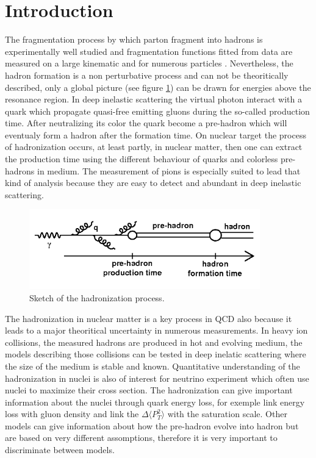 
\section{Introduction}
\label{physics}

The fragmentation process by which parton fragment into hadrons is 
experimentally well studied and fragmentation functions fitted from 
data are measured on a large kinematic and for numerous particles
\cite{AKK}.
Nevertheless, the hadron formation is a non perturbative process and can not 
be theoritically described, only a global picture 
(see figure \ref{fig:hadro}) can be drawn for
energies above the resonance region. In deep inelastic scattering the
virtual photon interact with a quark which propagate quasi-free emitting
gluons during the 
so-called production time. After neutralizing its color the quark become 
a pre-hadron which will eventualy form a hadron after the formation time.
On nuclear target the process of hadronization occurs, at least partly, in 
nuclear matter, then one can extract the production time using the different 
behaviour of quarks and colorless pre-hadrons in medium. The measurement of
pions is especially suited to lead that kind of analysis because they are easy
to detect and abundant in deep inelastic scattering.

\begin{figure}[htbp]
\centering
\includegraphics[width=10cm] {fig/hadro.png} 
\caption {Sketch of the hadronization process.}
\label{fig:hadro}
\end{figure}

The hadronization in nuclear matter is a key process in QCD also
because it leads to a major theoritical uncertainty in numerous measurements.
In heavy ion collisions, the measured hadrons are produced in hot and evolving 
medium, the models describing those collisions can be tested in deep inelatic scattering 
where the size of the medium is stable and known. Quantitative
understanding of the hadronization in nuclei is also of interest for
neutrino experiment which often use nuclei to maximize their cross section.
The hadronization can give important information about the 
nuclei through quark energy loss, for exemple \cite{Arleo:2003yf} link 
energy loss with gluon density and \cite{Kopeliovich:2010aa} link the $\Delta \langle
P_T^2 \rangle$ with the saturation scale. Other models \cite{Gallmeister:2007an}
can give information about how the pre-hadron evolve into hadron but are based
on very different assomptions, therefore it is very important to discriminate between
models. 

